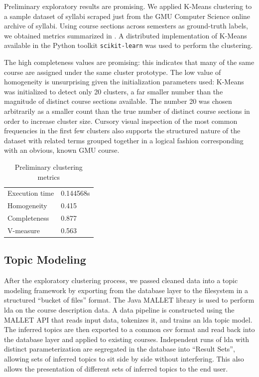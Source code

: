 
Preliminary exploratory results are promising.
We applied K-Means clustering to a sample dataset of syllabi scraped just from the GMU Computer Science online archive of syllabi.
Using course sections across semesters as ground-truth labels, we obtained metrics summarized in .
A distributed implementation of K-Means available in the Python toolkit \texttt{scikit-learn} was used to perform the clustering.


The high completeness values are promising: this indicates that many of the same course are assigned under the same cluster prototype.
The low value of homogeneity is unsurprising given the initialization parameters used: K-Means was initialized to detect only 20 clusters, a far smaller number than the magnitude of distinct course sections available.
The number 20 was chosen arbitrarily as a smaller count than the true number of distinct course sections in order to increase cluster size.
Cursory visual inspection of the most common frequencies in the first few clusters also supports the structured nature of the dataset with related terms grouped together in a logical fashion corresponding with an obvious, known GMU course.


\begin{table}[ht]
\centering
\begin{tabular}{ll}
\toprule
Execution time & 0.144568s \\
Homogeneity & 0.415 \\
Completeness & 0.877 \\
V-measure & 0.563 \\
\bottomrule
\end{tabular}
\caption{Preliminary clustering metrics\label{table:cluster-metrics}}
\end{table}


\subsection{Topic Modeling}
\label{sec:topic-modeling}

After the exploratory clustering process, we passed cleaned data into a topic modeling framework by exporting from the database layer to the filesystem in a structured ``bucket of files'' format.
The Java MALLET library is used to perform \ac{lda} on the course description data.
A data pipeline is constructed using the MALLET API that reads input data, tokenizes it, and trains an \ac{lda} topic model.
The inferred topics are then exported to a common \ac{csv} format and read back into the database layer and applied to existing courses.
Independent runs of \ac{lda} with distinct parameterization are segregated in the database into ``Result Sets'', allowing sets of inferred topics to sit side by side without interfering.
This also allows the presentation of different sets of inferred topics to the end user.


